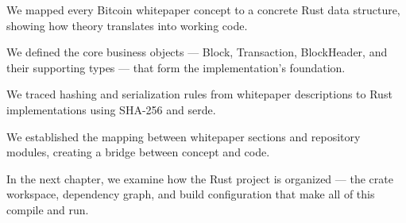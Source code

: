 \begin{chaptersummary}
  \item We mapped every Bitcoin whitepaper concept to a concrete Rust data structure, showing how theory translates into working code.
  \item We defined the core business objects --- Block, Transaction, BlockHeader, and their supporting types --- that form the implementation's foundation.
  \item We traced hashing and serialization rules from whitepaper descriptions to Rust implementations using SHA-256 and serde.
  \item We established the mapping between whitepaper sections and repository modules, creating a bridge between concept and code.
  \item In the next chapter, we examine how the Rust project is organized --- the crate workspace, dependency graph, and build configuration that make all of this compile and run.
\end{chaptersummary}
